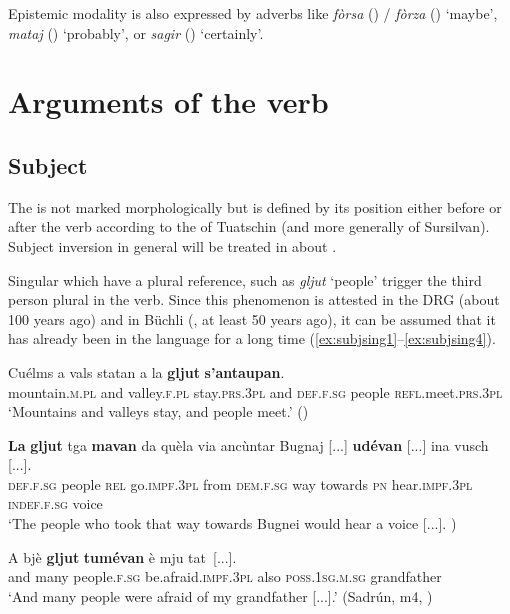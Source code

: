 Epistemic modality is also expressed by adverbs like \textit{fòrsa} () / \textit{fòrza} () `maybe', \textit{mataj} () `probably', or \textit{sagir} () `certainly'.

\largerpage
\section{Arguments of the verb}\label{sec:4.2}

\subsection{Subject}\label{sec:4.2.1}
The  is not marked morphologically but is defined by its position either before or after the verb according to the  of Tuatschin (and more generally of Sursilvan). Subject inversion in general will be treated in  about .

Singular  which have a plural reference, such as \textit{gljut} `people' trigger the third person plural in the verb. Since this phenomenon is attested in the DRG (about 100 years ago) and in Büchli (\citeyear{Büchli1966}, at least 50 years ago), it can be assumed that it has already been in the language for a long time (\ref{ex:subjsing1}--\ref{ex:subjsing4}).

\ea
\label{ex:subjsing1}
\gll Cuélms a vals statan a la \textbf{gljut} \textbf{s'antaupan}.\\
mountain.\textsc{m.pl} and valley.\textsc{f.pl} stay.\textsc{prs.3pl} and \textsc{def.f.sg} people \textsc{refl}.meet.\textsc{prs.3pl}\\
\glt `Mountains and valleys stay, and people meet.' ()
\z


\ea
\label{ex:subjsing2}
\gll \textbf{La} \textbf{gljut} tga \textbf{mavan} da quèla via ancùntar Bugnaj [...] \textbf{udévan} [...] ina vusch [...].\\
\textsc{def.f.sg} people \textsc{rel} go.\textsc{impf.3pl} from \textsc{dem.f.sg} way towards \textsc{pn} {} hear.\textsc{impf.3pl} {} \textsc{indef.f.sg} voice\\
\glt `The people who took that way towards Bugnei would hear a voice [...]. \citealt[142f.]{Büchli1966})
\z

\ea
\label{ex:subjsing3}
\gll  A bjè \textbf{gljut} \textbf{tumévan} è mju tat~[...].  \\
and many people.\textsc{f.sg} be.afraid.\textsc{impf.3pl} also \textsc{poss.1sg.m.sg} grandfather\\
\glt `And many people were afraid of my grandfather [...].' (Sadrún, m4, )
\z

